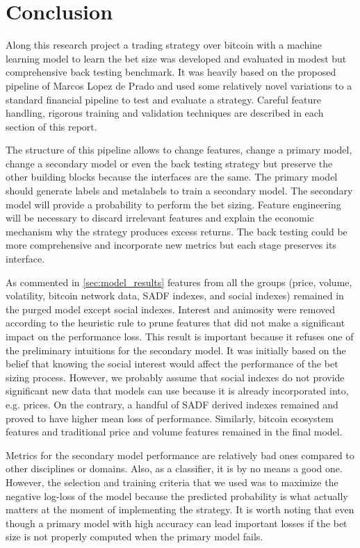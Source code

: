 \section{Conclusion}
\label{sec:conclusion}

Along this research project a trading strategy over bitcoin with a machine
learning model to learn the bet size was developed and evaluated in modest but
comprehensive back testing benchmark. It was heavily based on the proposed
pipeline of Marcos Lopez de Prado and used some relatively novel variations to
a standard financial pipeline to test and evaluate a strategy. Careful feature
handling, rigorous training and validation techniques are described in each
section of this report.

The structure of this pipeline allows to change features, change a primary model,
change a secondary model or even the back testing strategy but preserve the other
building blocks because the interfaces are the same. The primary model should 
generate labels and metalabels to train a secondary model. The secondary model
will provide a probability to perform the bet sizing. Feature engineering will
be necessary to discard irrelevant features and explain the economic mechanism
why the strategy produces excess returns. The back testing could be more
comprehensive and incorporate new metrics but each stage preserves its interface.

As commented in \ref{sec:model_results} features from all the groups (price, volume, volatility, bitcoin network data, SADF indexes, and social indexes) remained in
the purged model except social indexes. Interest and animosity were removed
according to the heuristic rule to prune features that did not make a significant
impact on the performance loss. This result is important because it refuses one
of the preliminary intuitions for the secondary model. It was initially based on the belief
that knowing the social interest would affect the performance of the bet sizing
process. However, we probably assume that social indexes do not provide significant
new data that models can use because it is already incorporated into, e.g. prices.
On the contrary, a handful of SADF derived indexes remained and proved
to have higher mean loss of performance. Similarly, bitcoin ecosystem features and
traditional price and volume features remained in the final model.

Metrics for the secondary model performance are relatively bad ones compared to
other disciplines or domains. Also, as a classifier, it is by no means a good one.
However, the selection and training criteria that we used was to maximize the
negative log-loss of the model because the predicted probability is what
actually matters at the moment of implementing the strategy. It is worth noting
that even though a primary model with high accuracy can lead important losses if
the bet size is not properly computed when the primary model fails.

